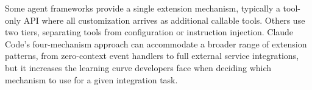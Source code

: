 Some agent frameworks provide a single extension mechanism, typically a tool-only API where all customization arrives as additional callable tools. Others use two tiers, separating tools from configuration or instruction injection. Claude Code's four-mechanism approach can accommodate a broader range of extension patterns, from zero-context event handlers to full external service integrations, but it increases the learning curve developers face when deciding which mechanism to use for a given integration task.
